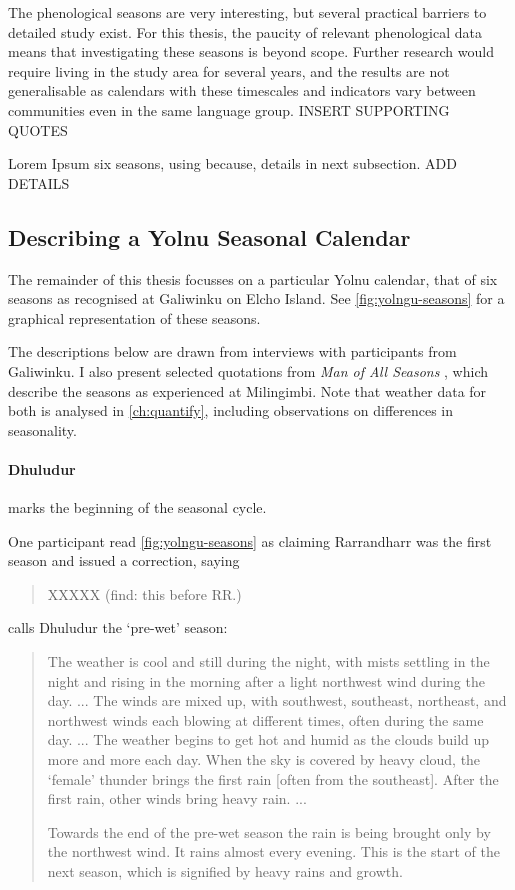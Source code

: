 The phenological seasons are very interesting, but several practical barriers to detailed study exist.
For this thesis, the paucity of relevant phenological data means that
investigating these seasons is beyond scope.
Further research would require living in the study area for several years,
and the results are not generalisable as calendars with these timescales and indicators
vary between communities even in the same language group.  INSERT SUPPORTING QUOTES


Lorem Ipsum six seasons, using because, details in next subsection.  ADD DETAILS



\subsection{Describing a Yolnu Seasonal Calendar}

The remainder of this thesis focusses on a particular Yolnu calendar,
that of six seasons as recognised at Galiwinku on Elcho Island.
See \autoref{fig:yolngu-seasons} for a graphical representation of these seasons.

The descriptions below are drawn from interviews with participants from Galiwinku.
I also present selected quotations from \textit{Man of All Seasons} \citep{davis1989},
which describe the seasons as experienced at Milingimbi.
Note that weather data for both is analysed in \autoref{ch:quantify},
including observations on differences in seasonality.


\paragraph{Dhuludur} marks the beginning of the seasonal cycle.

One participant read \autoref{fig:yolngu-seasons} as claiming Rarrandharr was the first season
and issued a correction, saying \blockquote{XXXXX (find: this before RR.)}.

\citet{davis1989} calls Dhuludur the `pre-wet' season:
\blockquote{
    The weather is cool and still during the night, with mists settling in the night and rising in the morning after a light northwest wind during the day. ...
    The winds are mixed up, with southwest, southeast, northeast, and northwest winds each blowing at different times, often during the same day. ...
    The weather begins to get hot and humid as the clouds build up more and more each day.
    When the sky is covered by heavy cloud, the `female' thunder brings the first rain [often from the southeast].
    After the first rain, other winds bring heavy rain. ...
    
    Towards the end of the pre-wet season the rain is being brought only by the northwest wind.
    It rains almost every evening.
    This is the start of the next season, which is signified by heavy rains and growth.
}

